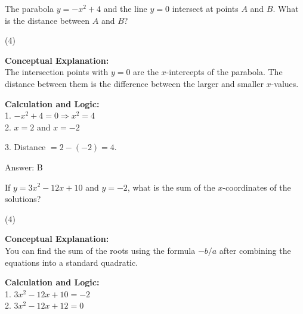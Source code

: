 \documentclass[11pt,paper=a4,answers]{exam}
\begin{document}
\begin{questions}
\vspace{40pt}

\question
The parabola $y = -x^2 + 4$ and the line $y = 0$ intersect at points $A$ and $B$. What is the distance between $A$ and $B$?
\begin{tasks}(4)
\end{tasks}

\begin{solution}
\textbf{Conceptual Explanation:} \\
The intersection points with $y = 0$ are the $x$-intercepts of the parabola. The distance between them is the difference between the larger and smaller $x$-values.

\vspace{20pt}

\textbf{Calculation and Logic:} \\
1. $-x^2 + 4 = 0 \Rightarrow x^2 = 4$ \\
2. $x = 2$ and $x = -2$

\vspace{10pt}

3. Distance $= 2 - (-2) = 4$.

\vspace{25pt}

Answer: \colorbox{yellow!100}{B}
\end{solution}

\vspace{40pt}

\question
If $y = 3x^2 - 12x + 10$ and $y = -2$, what is the sum of the $x$-coordinates of the solutions?
\begin{tasks}(4)
\end{tasks}

\begin{solution}
\textbf{Conceptual Explanation:} \\
You can find the sum of the roots using the formula $-b/a$ after combining the equations into a standard quadratic.

\vspace{20pt}

\textbf{Calculation and Logic:} \\
1. $3x^2 - 12x + 10 = -2$ \\
2. $3x^2 - 12x + 12 = 0$


\end{solution}
\end{questions}
\end{document}

